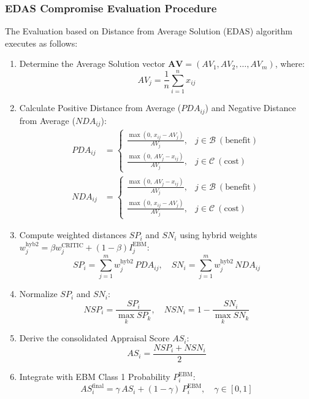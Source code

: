 \documentclass[twocolumn,10pt]{article}
\begin{document}
\subsubsection{EDAS Compromise Evaluation Procedure}
The Evaluation based on Distance from Average Solution (EDAS) algorithm executes as follows:
\begin{enumerate}
    \item Determine the Average Solution vector $\mathbf{AV} = (AV_1, AV_2, \dots, AV_m)$, where:
    \begin{equation}
        AV_j = \frac{1}{n} \sum_{i=1}^n x_{ij}
        \label{eq:edas_av}
    \end{equation}
    \item Calculate Positive Distance from Average ($PDA_{ij}$) and Negative Distance from Average ($NDA_{ij}$):
    \begin{align}
        PDA_{ij} &= \begin{cases}
            \frac{\max(0, \, x_{ij} - AV_j)}{AV_j}, & j \in \mathcal{B} \ (\text{benefit}) \\
            \frac{\max(0, \, AV_j - x_{ij})}{AV_j}, & j \in \mathcal{C} \ (\text{cost})
        \end{cases} \label{eq:edas_pda} \\
        NDA_{ij} &= \begin{cases}
            \frac{\max(0, \, AV_j - x_{ij})}{AV_j}, & j \in \mathcal{B} \ (\text{benefit}) \\
            \frac{\max(0, \, x_{ij} - AV_j)}{AV_j}, & j \in \mathcal{C} \ (\text{cost})
        \end{cases} \label{eq:edas_nda}
    \end{align}
    \item Compute weighted distances $SP_i$ and $SN_i$ using hybrid weights $w_j^{\text{hyb2}} = \beta w_j^{\text{CRITIC}} + (1 - \beta) I_j^{\text{EBM}}$:
    \begin{equation}
        SP_i = \sum_{j=1}^m w_j^{\text{hyb2}} \, PDA_{ij}, \quad SN_i = \sum_{j=1}^m w_j^{\text{hyb2}} \, NDA_{ij}
        \label{eq:edas_sp_sn}
    \end{equation}
    \item Normalize $SP_i$ and $SN_i$:
    \begin{equation}
        NSP_i = \frac{SP_i}{\max_k SP_k}, \quad NSN_i = 1 - \frac{SN_i}{\max_k SN_k}
        \label{eq:edas_norm}
    \end{equation}
    \item Derive the consolidated Appraisal Score $AS_i$:
    \begin{equation}
        AS_i = \frac{NSP_i + NSN_i}{2}
        \label{eq:edas_as}
    \end{equation}
    \item Integrate with EBM Class 1 Probability $P_i^{\text{EBM}}$:
    \begin{equation}
        AS_i^{\text{final}} = \gamma \, AS_i + (1 - \gamma) \, P_i^{\text{EBM}}, \quad \gamma \in [0, 1]
        \label{eq:final_hybrid_as}
    \end{equation}
\end{enumerate}
\end{document}
